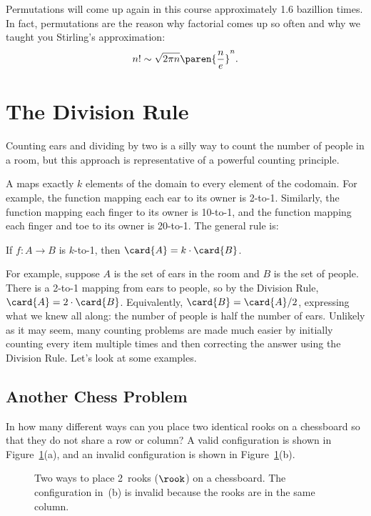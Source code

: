 Permutations will come up again in this course approximately 1.6
bazillion times.  In fact, permutations are the reason why factorial
comes up so often and why we taught you Stirling's approximation:
%
\[
n! \sim \sqrt{2 \pi n} \paren{\frac{n}{e}}^n.
\]

\section{The Division Rule}\label{division_rule_sec}

Counting ears and dividing by two is a silly way to count the number of
people in a room, but this approach is representative of a powerful
counting principle.

A  maps exactly $k$ elements of the domain to
every element of the codomain.  For example, the function mapping each
ear to its owner is 2-to-1. Similarly, the function mapping each
finger to its owner is 10-to-1, and the function mapping each finger
and toe to its owner is 20-to-1.  The general rule is:
\begin{rul}
If $f : A \to B$ is $k$-to-1, then $\card{A} = k \cdot \card{B}$.
\end{rul}

For example, suppose $A$ is the set of ears in the room and $B$ is the set
of people.  There is a 2-to-1 mapping from ears to people, so by the
Division Rule, $\card{A} = 2 \cdot \card{B}$.  Equivalently, $\card{B} =
\card{A} / 2$, expressing what we knew all along: the number of people is
half the number of ears.  Unlikely as it may seem, many counting problems
are made much easier by initially counting every item multiple times and
then correcting the answer using the Division Rule.  Let's look at some
examples.

\subsection{Another Chess Problem}

In how many different ways can you place two identical rooks on a
chessboard so that they do not share a row or column?  A valid
configuration is shown in Figure~\ref{fig:11Q8}(a), and an invalid
configuration is shown in Figure~\ref{fig:11Q8}(b).

\begin{figure}\normalbaselines

\subfloat[valid]{\chessboard[setpieces={ra1, rh8}]}
\subfloat[invalid]{\chessboard[setpieces={rd1, rd6}]}

\caption{Two ways to place 2~rooks ($\rook$) on a chessboard.  The
  configuration in~(b) is invalid because the rooks are in the same
  column.}

\label{fig:11Q8}

\end{figure}

